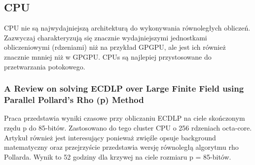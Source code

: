 \subsection{CPU}
CPU nie są najwydajniejszą architekturą do wykonywania równoległych obliczeń.
Zazwyczaj charakteryzują się znacznie wydajniejszymi jednostkami obliczeniowymi (rdzeniami)
niż na przykład GPGPU, ale jest ich również znacznie mnniej niż w GPGPU.
CPUs są najlepiej przystosowane do przetwarzania potokowego.
\subsubsection*{A Review on solving ECDLP over Large Finite Field using Parallel
	Pollard's Rho (p) Method}
Praca przedstawia wyniki czasowe przy obliczaniu ECDLP na
ciele skończonym rzędu p do 85-bitów.
Zastosowano do tego cluster CPU o 256 rdzeniach octa-core.
Artykuł również jest interesujący ponieważ zwięźle opsuje background matematyczny
oraz przejrzyście przedstawia wersję równoległą
algorytmu rho Pollarda\cite{rewiev-elliptic-cpu}.
Wynik to 52 godziny dla krzywej na ciele rozmiaru p = 85-bitów.


